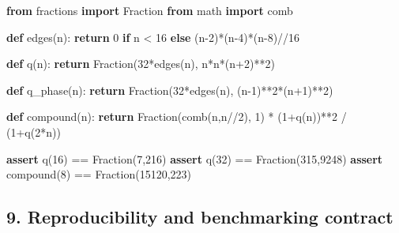 \documentclass[
  10pt,
]{article}
\newenvironment{Shaded}{}{}
\newcommand{\ControlFlowTok}[1]{\textcolor[rgb]{0.00,0.44,0.13}{\textbf{#1}}}
\newcommand{\DecValTok}[1]{\textcolor[rgb]{0.25,0.63,0.44}{#1}}
\newcommand{\ImportTok}[1]{\textcolor[rgb]{0.00,0.50,0.00}{\textbf{#1}}}
\newcommand{\KeywordTok}[1]{\textcolor[rgb]{0.00,0.44,0.13}{\textbf{#1}}}
\newcommand{\NormalTok}[1]{#1}
\newcommand{\OperatorTok}[1]{\textcolor[rgb]{0.40,0.40,0.40}{#1}}
\begin{document}
\begin{Shaded}
\begin{Highlighting}[]
\ImportTok{from}\NormalTok{ fractions }\ImportTok{import}\NormalTok{ Fraction}
\ImportTok{from}\NormalTok{ math }\ImportTok{import}\NormalTok{ comb}

\KeywordTok{def}\NormalTok{ edges(n):}
    \ControlFlowTok{return} \DecValTok{0} \ControlFlowTok{if}\NormalTok{ n }\OperatorTok{\textless{}} \DecValTok{16} \ControlFlowTok{else}\NormalTok{ (n}\OperatorTok{{-}}\DecValTok{2}\NormalTok{)}\OperatorTok{*}\NormalTok{(n}\OperatorTok{{-}}\DecValTok{4}\NormalTok{)}\OperatorTok{*}\NormalTok{(n}\OperatorTok{{-}}\DecValTok{8}\NormalTok{)}\OperatorTok{//}\DecValTok{16}

\KeywordTok{def}\NormalTok{ q(n):}
    \ControlFlowTok{return}\NormalTok{ Fraction(}\DecValTok{32}\OperatorTok{*}\NormalTok{edges(n), n}\OperatorTok{*}\NormalTok{n}\OperatorTok{*}\NormalTok{(n}\OperatorTok{+}\DecValTok{2}\NormalTok{)}\OperatorTok{**}\DecValTok{2}\NormalTok{)}

\KeywordTok{def}\NormalTok{ q\_phase(n):}
    \ControlFlowTok{return}\NormalTok{ Fraction(}\DecValTok{32}\OperatorTok{*}\NormalTok{edges(n), (n}\OperatorTok{{-}}\DecValTok{1}\NormalTok{)}\OperatorTok{**}\DecValTok{2}\OperatorTok{*}\NormalTok{(n}\OperatorTok{+}\DecValTok{1}\NormalTok{)}\OperatorTok{**}\DecValTok{2}\NormalTok{)}

\KeywordTok{def}\NormalTok{ compound(n):}
    \ControlFlowTok{return}\NormalTok{ Fraction(comb(n,n}\OperatorTok{//}\DecValTok{2}\NormalTok{), }\DecValTok{1}\NormalTok{) }\OperatorTok{*}\NormalTok{ (}\DecValTok{1}\OperatorTok{+}\NormalTok{q(n))}\OperatorTok{**}\DecValTok{2} \OperatorTok{/}\NormalTok{ (}\DecValTok{1}\OperatorTok{+}\NormalTok{q(}\DecValTok{2}\OperatorTok{*}\NormalTok{n))}

\ControlFlowTok{assert}\NormalTok{ q(}\DecValTok{16}\NormalTok{) }\OperatorTok{==}\NormalTok{ Fraction(}\DecValTok{7}\NormalTok{,}\DecValTok{216}\NormalTok{)}
\ControlFlowTok{assert}\NormalTok{ q(}\DecValTok{32}\NormalTok{) }\OperatorTok{==}\NormalTok{ Fraction(}\DecValTok{315}\NormalTok{,}\DecValTok{9248}\NormalTok{)}
\ControlFlowTok{assert}\NormalTok{ compound(}\DecValTok{8}\NormalTok{) }\OperatorTok{==}\NormalTok{ Fraction(}\DecValTok{15120}\NormalTok{,}\DecValTok{223}\NormalTok{)}
\end{Highlighting}
\end{Shaded}

\subsection{9. Reproducibility and benchmarking
contract}\label{reproducibility-and-benchmarking-contract}
\end{document}
